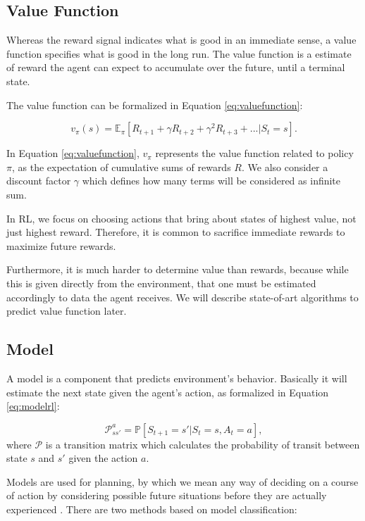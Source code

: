 \subsection{Value Function}\label{sec:valuefunction}
Whereas the reward signal indicates what is good in an immediate sense, a value function specifies what is good in the long run. The value function is a estimate of reward the agent can expect to accumulate over the future, until a terminal state. 

The value function can be formalized in Equation \ref{eq:valuefunction}:

\begin{equation}\label{eq:valuefunction}
v_{\pi}(s) = \mathbb{E}_{\pi}[R_{t+1} + \gamma R_{t+2} + \gamma^{2} R_{t + 3} + ... | S_{t} = s].
\end{equation}

In Equation \ref{eq:valuefunction}, $v_{\pi}$ represents the value function related to policy $\pi$, as the expectation of cumulative sums of rewards $R$. We also consider a discount factor $\gamma$ which defines how many terms will be considered as infinite sum.

In RL, we focus on choosing actions that bring about states of highest value, not just highest reward. Therefore, it is common to sacrifice immediate rewards to maximize future rewards.

Furthermore, it is much harder to determine value than rewards, because while this is given directly from the environment, that one must be estimated accordingly to data the agent receives. We will describe state-of-art algorithms to predict value function later.

\subsection{Model}

A model is a component that predicts environment's behavior. Basically it will estimate the next state given the agent's action, as formalized in Equation \ref{eq:modelrl}:

\begin{equation}\label{eq:modelrl}
\mathcal{P}_{ss'}^{a} = \mathbb{P}[S_{t+1} = s' | S_{t} = s, A_{t} = a],
\end{equation}
where $\mathcal{P}$ is a transition matrix which calculates the probability of transit between state $s$ and $s'$ given the action $a$.

Models are used for planning, by which we
mean any way of deciding on a course of action by considering possible future situations before they are
actually experienced \cite{sutton1998rli}. There are two methods based on model classification:

